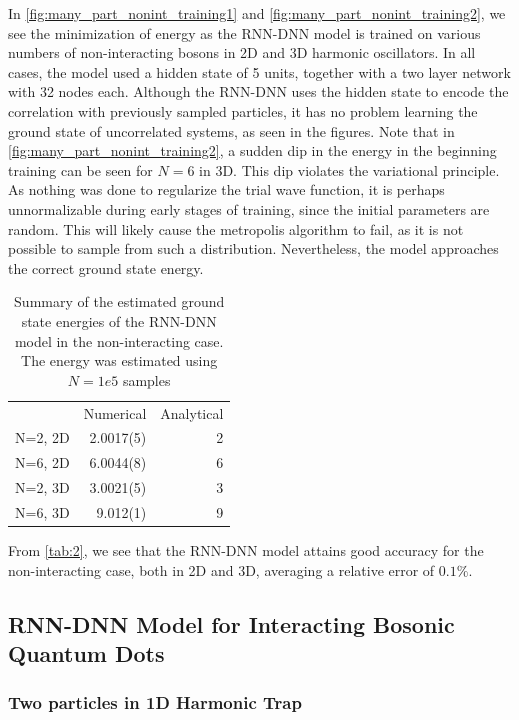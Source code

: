In \autoref{fig:many_part_nonint_training1} and \autoref{fig:many_part_nonint_training2}, we see the minimization of energy as the RNN-DNN model is trained on various numbers of non-interacting bosons in 2D and 3D harmonic oscillators. In all cases, the model used a hidden state of 5 units, together with a two layer network with 32 nodes each. Although the RNN-DNN uses the hidden state to encode the correlation with previously sampled particles, it has no problem learning the ground state of uncorrelated systems, as seen in the figures. Note that in  \autoref{fig:many_part_nonint_training2}, a sudden dip in the energy in the beginning training can be seen for $N=6$ in 3D. This dip violates the variational principle. As nothing was done to regularize the trial wave function, it is perhaps unnormalizable during early stages of training, since the initial parameters are random. This will likely cause the metropolis algorithm to fail, as it is not possible to sample from such a distribution. Nevertheless, the model approaches the correct ground state energy.

\begin{table}[ht]
	\begin{tabular}{r|rr}
		\toprule
		& Numerical& Analytical     \\
		N=2, 2D    & 2.0017(5) &  2 \\
		N=6, 2D    & 6.0044(8) &  6 \\
		N=2, 3D    & 3.0021(5) &  3 \\
		N=6, 3D    & 9.012(1)  &  9 \\
		\bottomrule
	\end{tabular}
	\caption{Summary of the estimated ground state energies of the RNN-DNN model in the non-interacting case. The energy was estimated using $N=1e5$ samples}
	\label{tab:2}
\end{table}

From \autoref{tab:2}, we see that the RNN-DNN model attains good accuracy for the non-interacting case, both in 2D and 3D, averaging a relative error of $0.1\%$.

\subsection{RNN-DNN Model for Interacting Bosonic Quantum Dots}
\subsubsection{Two particles in 1D Harmonic Trap}

